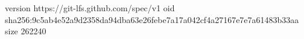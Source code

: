 version https://git-lfs.github.com/spec/v1
oid sha256:9c5ab4e52a9d2358da94dba63e26febe7a17a042cf4a27167e7e7a61483b33aa
size 262240
